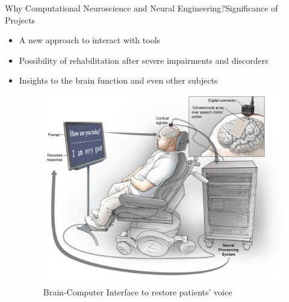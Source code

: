 \documentclass[
11pt,notheorems,hyperref={pdfauthor=whatever}
]{beamer}
\begin{document}

\begin{frame}{Why Computational Neuroscience and Neural Engineering?}{Significance of Projects}
    \begin{itemize}
        \item A new approach to interact with tools
        \item Possibility of rehabilitation after severe impairments and discorders
        \item Insights to the brain function and even other subjects
        \begin{figure}[h]
            \renewcommand{\figurename}{Figure 9}
            \includegraphics [scale=0.6] {Neuro_BCI.jpg} 
            \captionsetup{justification=centering}
            \caption{Brain-Computer Interface to restore patients' voice \cite{changlabfig}}
        \end{figure}
    \end{itemize}
\end{frame}

\end{document}
